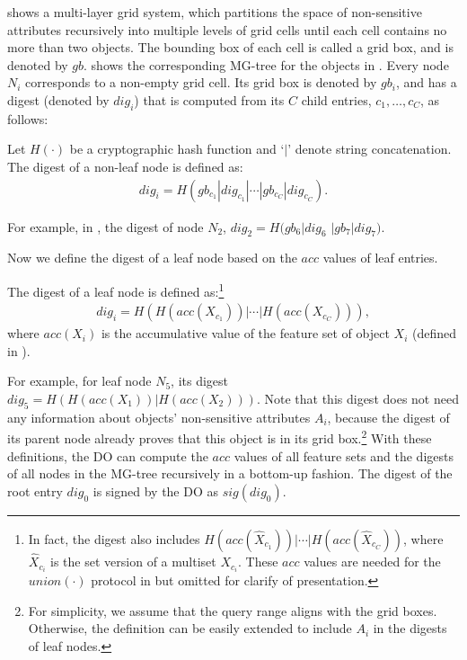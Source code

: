  shows a multi-layer grid system, which partitions the space of non-sensitive attributes recursively into multiple levels of grid cells until each cell contains no more than two objects. The bounding box of each cell is called a grid box, and is denoted by $gb$.  shows the corresponding MG-tree for the objects in . Every node $N_i$ corresponds to a non-empty grid cell. Its grid box is denoted by $gb_i$, and has a digest (denoted by $dig_i$) that is computed from its $C$ child entries, $c_1, \dots, c_C$, as follows:

\begin{definition}
  Let $H(\cdot)$ be a cryptographic hash function and `$|$' denote string concatenation. The digest of a non-leaf node is defined as:
  \begin{align*}
    dig_i = H(gb_{c_1} | dig_{c_1} | \cdots | gb_{c_C} | dig_{c_C} ).
  \end{align*}
\end{definition}
For example, in , the digest of node $N_2$, $dig_2 = H(gb_6 | dig_6$ $| gb_7 | dig_7)$.

Now we define the digest of a leaf node based on the $acc$ values of leaf entries.
\begin{definition}
  The digest of a leaf node is defined as:\footnote{In fact, the digest also includes $H(acc(\widehat{X}_{c_1}))|\cdots|H(acc(\widehat{X}_{c_C}))$, where $\widehat{X}_{c_i}$ is the set version of a multiset $X_{c_i}$. These $acc$ values are needed for the $union(\cdot)$ protocol in  but omitted for clarify of presentation.}
  \begin{align*}
    dig_i = H(H(acc(X_{c_1})) | \cdots | H(acc(X_{c_C})) ),
  \end{align*}
  where $acc(X_i)$ is the accumulative value of the feature set of object $X_i$ (defined in ).
\end{definition}
For example, for leaf node $N_5$, its digest ${dig}_5 = H(H(acc(X_1)) | H(acc(X_2)))$. Note that this digest does not need any information about objects' non-sensitive attributes $A_i$, because the digest of its parent node already proves that this object is in its grid box.\footnote{For simplicity, we assume that the query range aligns with the grid boxes. Otherwise, the definition can be easily extended to include $A_i$ in the digests of leaf nodes.} With these definitions, the DO can compute the $acc$ values of all feature sets and the digests of all nodes in the MG-tree recursively in a bottom-up fashion. The digest of the root entry $dig_0$ is signed by the DO as $sig(dig_0)$.

